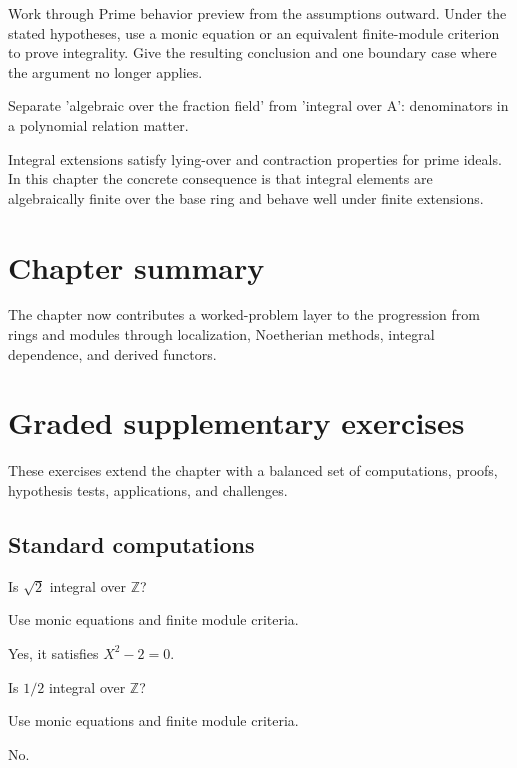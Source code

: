 \begin{exercise}\label{exr:v19-08}
Work through Prime behavior preview from the assumptions outward. Under the stated hypotheses, use a monic equation or an equivalent finite-module criterion to prove integrality. Give the resulting conclusion and one boundary case where the argument no longer applies.
\end{exercise}
\begin{hint}
Separate 'algebraic over the fraction field' from 'integral over A': denominators in a polynomial relation matter.
\end{hint}
\begin{solution}
Integral extensions satisfy lying-over and contraction properties for prime ideals. In this chapter the concrete consequence is that integral elements are algebraically finite over the base ring and behave well under finite extensions.
\end{solution}

\section*{Chapter summary}
The chapter now contributes a worked-problem layer to the progression from rings and modules through localization, Noetherian methods, integral dependence, and derived functors.
\section{Graded supplementary exercises}
These exercises extend the chapter with a balanced set of computations, proofs, hypothesis tests, applications, and challenges.

\subsection*{Standard computations}

\begin{exercise}\label{exr:v19-expand-01}
Is $\sqrt2$ integral over $\mathbb Z$?
\end{exercise}
\begin{hint}
Use monic equations and finite module criteria.
\end{hint}
\begin{solution}
Yes, it satisfies $X^2-2=0$.
\end{solution}

\begin{exercise}[Rational]\label{exr:v19-expand-02}
Is $1/2$ integral over $\mathbb Z$?
\end{exercise}
\begin{hint}
Use monic equations and finite module criteria.
\end{hint}
\begin{solution}
No.
\end{solution}

